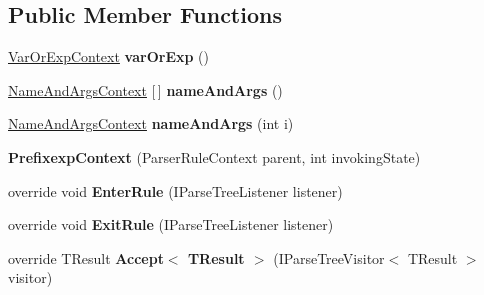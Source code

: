 \subsection*{Public Member Functions}
\begin{DoxyCompactItemize}
\item 
\mbox{\label{classzlua_1_1_lua_parser_1_1_prefixexp_context_a8b1bb49e2720b8498eee2666cab2f0e5}} 
\mbox{\hyperlink{classzlua_1_1_lua_parser_1_1_var_or_exp_context}{Var\+Or\+Exp\+Context}} {\bfseries var\+Or\+Exp} ()
\item 
\mbox{\label{classzlua_1_1_lua_parser_1_1_prefixexp_context_a6f6e0d7d8b0a86eef30205355c2f29f5}} 
\mbox{\hyperlink{classzlua_1_1_lua_parser_1_1_name_and_args_context}{Name\+And\+Args\+Context}} \mbox{[}$\,$\mbox{]} {\bfseries name\+And\+Args} ()
\item 
\mbox{\label{classzlua_1_1_lua_parser_1_1_prefixexp_context_aa9c066df165fd320f3943ad95cd922a2}} 
\mbox{\hyperlink{classzlua_1_1_lua_parser_1_1_name_and_args_context}{Name\+And\+Args\+Context}} {\bfseries name\+And\+Args} (int i)
\item 
\mbox{\label{classzlua_1_1_lua_parser_1_1_prefixexp_context_a6f6adfa25b25c7bcc7e540e02fb112b2}} 
{\bfseries Prefixexp\+Context} (Parser\+Rule\+Context parent, int invoking\+State)
\item 
\mbox{\label{classzlua_1_1_lua_parser_1_1_prefixexp_context_a7fd529287eed04aa3b09575b1e018cc6}} 
override void {\bfseries Enter\+Rule} (I\+Parse\+Tree\+Listener listener)
\item 
\mbox{\label{classzlua_1_1_lua_parser_1_1_prefixexp_context_aae0bac545810523ad5de9daccc6b7d83}} 
override void {\bfseries Exit\+Rule} (I\+Parse\+Tree\+Listener listener)
\item 
\mbox{\label{classzlua_1_1_lua_parser_1_1_prefixexp_context_a6768eaed512b8666405dafbc15b305e6}} 
override T\+Result {\bfseries Accept$<$ T\+Result $>$} (I\+Parse\+Tree\+Visitor$<$ T\+Result $>$ visitor)
\end{DoxyCompactItemize}
